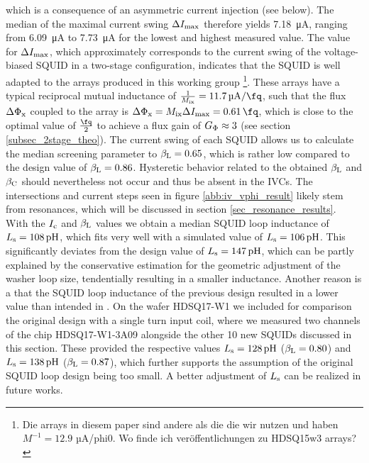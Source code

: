 which is a consequence of an asymmetric current injection (see below). The median of the maximal current swing $\Delta I_{\rm max}$ therefore yields \qty{7.18}{\micro\ampere}, ranging from \qty{6.09}{\micro\ampere} to \qty{7.73}{\micro\ampere} for the lowest and highest measured value. The value for $\Delta I_{\rm max}$, which approximately corresponds to the current swing of the voltage-biased SQUID in a two-stage configuration, indicates that the SQUID is well adapted to the arrays produced in this working group \cite{Kempf2015}\footnote{Die arrays in diesem paper sind andere als die die wir nutzen und haben $M^{-1}=12.9$ µA/phi0. Wo finde ich veröffentlichungen zu HDSQ15w3 arrays?}. These arrays have a typical reciprocal mutual inductance of $\frac{1}{M_{\rm ix}}=\qty{11.7}{\micro\ampere\per\fq}$, such that the flux $\Delta\Phi_{\rm x}$ coupled to the array is $\Delta\Phi_{\rm x}=M_{\rm ix}\Delta I_{\rm max}=\qty{0.61}{\fq}$, which is close to the optimal value of $\frac{\unit{\fq}}{2}$ to achieve a flux gain of $G_{\rm \Phi}\approx 3$ (see section \ref{subsec_2stage_theo}). The current swing of each SQUID allows us to calculate the median screening parameter to $\beta_{\rm L}=0.65$, which is rather low compared to the design value of $\beta_{\rm L}=0.86$. Hysteretic behavior related to the obtained $\beta_{\rm L}$ and $\beta_{\rm C}$ should nevertheless not occur and thus be absent in the IVCs. The intersections and current steps seen in figure \ref{abb:iv_vphi_result} likely stem from resonances, which will be discussed in section \ref{sec_resonance_results}. \\ 

With the $I_{\rm c}$ and $\beta_{\rm L}$ values we obtain a median SQUID loop inductance of $L_{\rm s}=\qty{108}{\pico\henry}$, which fits very well with a simulated value of $L_{\rm s}=\qty{106}{\pico\henry}$. This significantly deviates from the design value of $L_{\rm s}=\qty{147}{\pico\henry}$, which can be partly explained by the conservative estimation for the geometric adjustment of the washer loop size, tendentially resulting in a smaller inductance. Another reason is a that the SQUID loop inductance of the previous design resulted in a lower value than intended in \cite{Bauer2022}. On the wafer HDSQ17-W1 we included for comparison the original design with a single turn input coil, where we measured two channels of the chip HDSQ17-W1-3A09 alongside the other 10 new SQUIDs discussed in this section. These provided the respective values $L_{\rm s}=\qty{128}{\pico\henry}$ ($\beta_{\rm L}=0.80$) and $L_{\rm s}=\qty{138}{\pico\henry}$ ($\beta_{\rm L}=0.87$), which further supports the assumption of the original SQUID loop design being too small. A better adjustment of $L_{\rm s}$ can be realized in future works. \\ 
 
